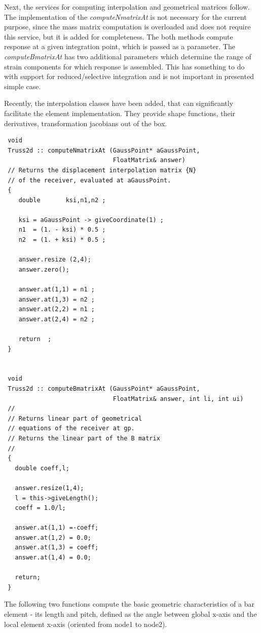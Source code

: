 \documentclass[a4paper]{article}
\newcommand{\service}[1]{{\em #1}}
\begin{document}
 Next, the services for computing interpolation and geometrical matrices
 follow. The implementation of the \service{computeNmatrixAt}  is not necessary
 for the current purpose, since the mass matrix computation is overloaded
 and does not require this service, but it is added for completeness.
 The both methods compute response at a given integration point, which is
 passed as a parameter. The \service{computeBmatrixAt} has two additional
 parameters which determine the range of strain components for which
 response is assembled. This has something to do with support for
 reduced/selective integration and is not important in presented simple case.

 Recently, the interpolation classes have been added, that can significantly facilitate the element implementation. They provide shape functions, their derivatives, transformation jacobians out of the box. 
 \begin{verbatim}
 void
 Truss2d :: computeNmatrixAt (GaussPoint* aGaussPoint, 
                              FloatMatrix& answer) 
 // Returns the displacement interpolation matrix {N} 
 // of the receiver, evaluated at aGaussPoint.
 {
    double       ksi,n1,n2 ;

    ksi = aGaussPoint -> giveCoordinate(1) ;
    n1  = (1. - ksi) * 0.5 ;
    n2  = (1. + ksi) * 0.5 ;

    answer.resize (2,4);
    answer.zero();

    answer.at(1,1) = n1 ;
    answer.at(1,3) = n2 ;
    answer.at(2,2) = n1 ;
    answer.at(2,4) = n2 ;

    return  ;
 }


 void
 Truss2d :: computeBmatrixAt (GaussPoint* aGaussPoint, 
                              FloatMatrix& answer, int li, int ui)
 // 
 // Returns linear part of geometrical 
 // equations of the receiver at gp.
 // Returns the linear part of the B matrix
 //
 {
   double coeff,l;

   answer.resize(1,4);
   l = this->giveLength();
   coeff = 1.0/l;

   answer.at(1,1) =-coeff;
   answer.at(1,2) = 0.0;
   answer.at(1,3) = coeff;
   answer.at(1,4) = 0.0;

   return;
 }
 \end{verbatim}

 The following two functions compute the basic geometric
 characteristics of a bar element - its length and pitch, defined as the
 angle between global x-axis and the local element x-axis (oriented
 from node1 to node2).
\end{document}
